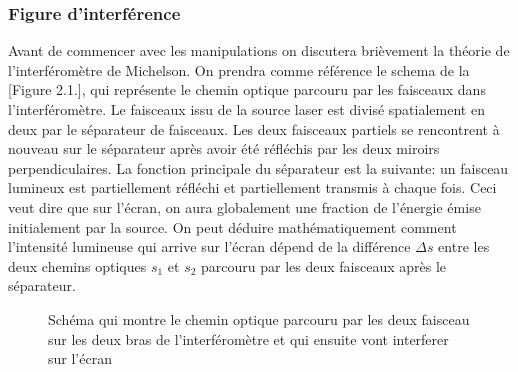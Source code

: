 \documentclass[11pt, openright]{book}
\begin{document}
				\subsubsection{Figure d'interférence}

				Avant de commencer avec les manipulations on discutera brièvement la théorie de l'interféromètre de Michelson. On prendra comme référence le schema de la [Figure 2.1.], qui représente le chemin optique parcouru par les faisceaux dans l'interféromètre. Le faisceaux issu de la source laser est divisé spatialement en deux par le séparateur de faisceaux. Les deux faisceaux partiels se rencontrent à nouveau sur le séparateur après avoir été réfléchis par les deux miroirs perpendiculaires. La fonction principale du séparateur est la suivante: un faisceau lumineux est partiellement réfléchi et partiellement transmis à chaque fois. Ceci veut dire que sur l'écran, on aura globalement une fraction de l'énergie émise initialement par la source. On peut déduire mathématiquement comment l'intensité lumineuse qui arrive sur l'écran dépend de la différence $\Delta s$ entre les deux chemins optiques $s_1$ et $s_2$ parcouru par les deux faisceaux après le séparateur.

					\begin{figure}[!ht]
						\centering
						\caption{Schéma qui montre le chemin optique parcouru par les deux faisceau sur les deux bras de l'interféromètre et qui ensuite vont interferer sur l'écran}
					\end{figure}
\end{document}
